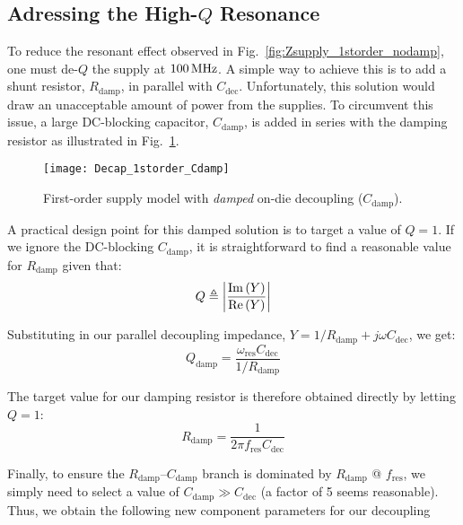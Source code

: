 \subsection{Adressing the High-$Q$ Resonance}
\par To reduce the resonant effect observed in Fig.~\ref{fig:Zsupply_1storder_nodamp},
one must de-$Q$ the supply at $100\mathrm{\,MHz}$.  A simple way to achieve this is
to add a shunt resistor, $R_\mathrm{damp}$, in parallel with $C_\mathrm{dec}$.
Unfortunately, this solution would draw an unacceptable amount of power from
the supplies. To circumvent this issue, a large DC-blocking capacitor,
$C_\mathrm{damp}$, is added in series with the damping resistor as
illustrated in Fig.~\ref{fig:Decap_1storder_damp}.
%
\begin{figure}[!ht]
	\centering
	\texttt{[image: Decap\_1storder\_Cdamp]}
	\caption{First-order supply model with \emph{damped} on-die decoupling ($C_\mathrm{damp}$).}
\label{fig:Decap_1storder_damp}%
\end{figure}
%
\par A practical design point for this damped solution is to target a value of
$Q=1$. If we ignore the DC-blocking $C_\mathrm{damp}$, it is straightforward
to find a reasonable value for $R_\mathrm{damp}$ given that:
%
\begin{equation}
	Q \triangleq \left |\frac{\mathrm{Im}\left(Y\right)}{\mathrm{Re}\left(Y\right)}\right |
\end{equation}
%
\par\noindent Substituting in our parallel decoupling impedance, 
$Y=1/R_\mathrm{damp} + j\omega C_\mathrm{dec}$, we get:
\begin{equation}
	Q_\mathrm{damp} = \frac{\omega_\mathrm{res} C_\mathrm{dec}}{1/R_\mathrm{damp}}
\end{equation}
%
\par\noindent The target value for our damping resistor is therefore
obtained directly by letting $Q=1$:
\begin{equation}
	R_\mathrm{damp} = \frac{1}{2\pi f_\mathrm{res}C_\mathrm{dec}}
\end{equation}
%
\par Finally, to ensure the $R_\mathrm{damp}$--$C_\mathrm{damp}$ branch is
dominated by $R_\mathrm{damp}$ @ $f_\mathrm{res}$, we simply need to select a
value of $C_\mathrm{damp} \gg C_\mathrm{dec}$ (a factor of 5 seems reasonable).
Thus, we obtain the following new component parameters for our decoupling
